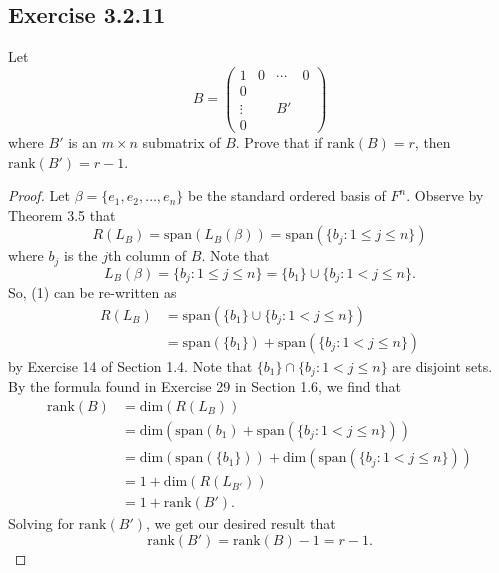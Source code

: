 \subsection*{Exercise 3.2.11} Let
    \[  B = \begin{pmatrix} 
        1 & 0 & \cdots & 0  \\
        0  &  \\
        \vdots & & B' &   \\
        0 &    &
              \end{pmatrix} \]
    where \( B'  \) is an \( m \times n \) submatrix of \( B  \). Prove that if \( \text{rank}(B) = r  \), then \( \text{rank}(B') = r - 1  \).
    \begin{proof}
    Let \( \beta = \{ {e}_{1}, {e}_{2}, \dots, {e}_{n} \}  \) be the standard ordered basis of \( F^{n} \). Observe by Theorem 3.5 that
    \[  R({L}_{B}) = \text{span}({L}_{B}(\beta)) =  \text{span}(\{ {b}_{j} : 1 \leq j \leq n  \} ) \tag{1} \]
    where \( {b}_{j} \) is the \( j \)th column of \( B \). Note that
    \[  {L}_{B}(\beta) = \{ {b}_{j} : 1 \leq j \leq n  \} = \{ {b}_{1} \} \cup \{ {b}_{j} : 1 <  j \leq n  \}.   \]
    So, (1) can be re-written as
    \begin{align*}  
    R({L}_{B}) &= \text{span}(\{ {b}_{1} \} \cup \{ {b}_{j} : 1 < j \leq n \}) \\
               &=  \text{span}(\{ {b}_{1} \} ) + \text{span}(\{ {b}_{j} : 1 < j \leq  n \} )
\end{align*}
by Exercise 14 of Section 1.4. Note that \( \{ {b}_{1} \}  \cap \{ {b}_{j} : 1 < j \leq n \}  \) are disjoint sets. By the formula found in Exercise 29 in Section 1.6, we find that
\begin{align*}
    \text{rank}(B) &= \text{dim}(R({L}_{B})) \\
                   &= \text{dim}(\text{span}({b}_{1}) + \text{span}(\{ {b}_{j} : 1 < j \leq n  \} )) \\
                   &= \text{dim}(\text{span}(\{ {b}_{1} \})) + \text{dim}(\text{span}(\{ {b}_{j} : 1 < j \leq  n \})) \\ 
                   &= 1 + \text{dim}(R({L}_{B'})) \tag{Theorem 3.5} \\
                   &= 1 + \text{rank}(B').
\end{align*}
Solving for \( \text{rank}(B') \), we get our desired result that
\[  \text{rank}(B') = \text{rank}(B) - 1 = r - 1. \]
    \end{proof}


